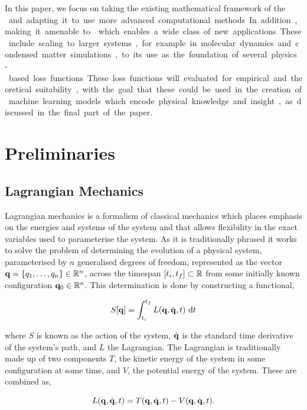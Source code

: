 In this paper, we focus on taking the existing mathematical framework of the \SI{} and adapting it to use more advanced computational methods. In addition, making it amenable to \autodiff{} which enables a wide class of new applications.
These include scaling to larger systems, for example in molecular dynamics and condensed matter simulations, to its use as the foundation of several physics-based loss functions. These loss functions will evaluated for empirical and theoretical suitability, with the goal that these could be used in the creation of machine learning models which encode physical knowledge and insight, as discussed in the final part of the paper.

\section{Preliminaries}

\subsection{Lagrangian Mechanics}
\label{sec:lag-mech}

Lagrangian mechanics is a formalism of classical mechanics which places emphasis on the energies and systems of the system and that allows flexibility in the exact variables used to parameterise the system.
As it is traditionally phrased it works to solve the problem of determining the evolution of a physical system, parameterised by $n$ generalised degrees of freedom, represented as the vector $\vb q = \left\{q_1, \dots, q_n\right\} \in \mathbb{R}^n$, across the timespan $[t_i, t_f] \subset \mathbb{R}$ from some initially known configuration $\vb q_0 \in \mathbb{R}^n$. This determination is done by constructing a functional,

\begin{equation}
  \label{eq:trad-action}
  S[\vb{q}] = \int_{t_i}^{t_f} L(\vb{q}, \dot{\vb{q}}, t) ~\mathrm{d} t
\end{equation}

where $S$ is known as the action of the system, $\dot{\vb{q}}$ is the standard time derivative of the system's path, and $L$ the Lagrangian. The Lagrangian is traditionally made up of two components $T$, the kinetic energy of the system in some configuration at some time, and $V$, the potential energy of the system. These are combined as,

\begin{equation}
  \label{eq:trad-lag}
  L(\vb{q}, \dot{\vb{q}}, t) = T(\vb{q}, \dot{\vb{q}}, t) - V(\vb{q}, \dot{\vb{q}}, t).
\end{equation}

